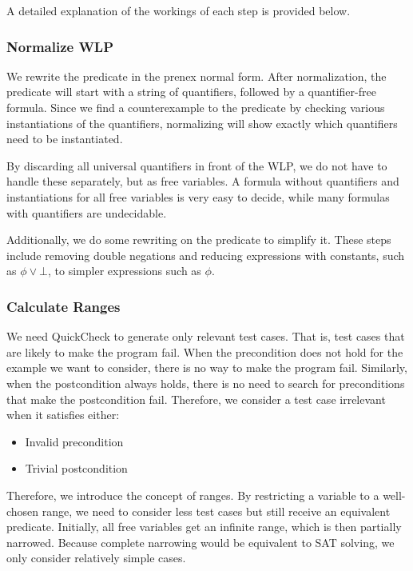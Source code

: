 \documentclass[a4paper]{article}
\begin{document}
A detailed explanation of the workings of each step is provided below.

\subsubsection*{Normalize WLP}

We rewrite the predicate in the prenex normal form. After normalization, the
predicate will start with a string of quantifiers, followed by a quantifier-free
formula. Since we find a counterexample to the predicate by checking various
instantiations of the quantifiers, normalizing will show exactly which
quantifiers need to be instantiated.

By discarding all universal quantifiers in front of the WLP, we do not have to
handle these separately, but as free variables. A formula without quantifiers
and instantiations for all free variables is very easy to decide, while many
formulas with quantifiers are undecidable.

Additionally, we do some rewriting on the predicate to simplify it. These steps
include removing double negations and reducing expressions with constants,
such as $\phi \vee \bot$, to simpler expressions such as $\phi$.

\subsubsection*{Calculate Ranges}

We need QuickCheck to generate only relevant test cases. That is, test cases that
are likely to make the program fail. When the precondition does not hold
for the example we want to consider, there is no way to make the program fail.
Similarly, when the postcondition always holds, there is no need to search for
preconditions that make the postcondition fail. Therefore, we consider a test
case irrelevant when it satisfies either:

\begin{itemize}
\item Invalid precondition
\item Trivial postcondition
\end{itemize}

Therefore, we introduce the concept of ranges. By restricting a variable to a
well-chosen range, we need to consider less test cases but still receive an
equivalent predicate. Initially, all free variables get an infinite range, which
is then partially narrowed. Because complete narrowing would be equivalent to
SAT solving, we only consider relatively simple cases.
\end{document}
